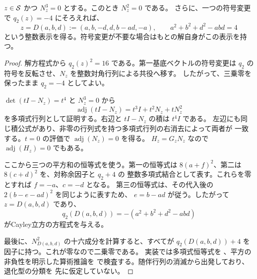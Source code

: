 \begin{proposition}[退化型の整数正規表示]
\label{bp:deg-reduced}
\leanok
\(z\in\mathcal S\) かつ \(N_z^3=0\) とする。このとき \(N_z^2=0\) である。
さらに、一つの符号変更で \(q_2(z)=-4\) にそろえれば、
\[
 z=D(a,b,d):=(a,b,-d,d,b-ad,-a),
 \qquad a^2+b^2+d^2-abd=4
\]
という整数表示を得る。符号変更が不要な場合はもとの解自身がこの表示を持つ。
\end{proposition}
\begin{proof}
\leanok
解方程式から \(q_2(z)^2=16\) である。第一基底ベクトルの符号変更は
\(q_2\) の符号を反転させ、\(N_z\) を整数対角行列による共役へ移す。
したがって、三乗零を保ったまま \(q_2=-4\) としてよい。

\(\det(tI-N_z)=t^4\) と \(N_z^3=0\) から
\[
 \operatorname{adj}(tI-N_z)=t^3I+t^2N_z+tN_z^2
\]
を多項式行列として証明する。右辺と \(tI-N_z\) の積は \(t^4I\) である。
左辺にも同じ積公式があり、非零の行列式を持つ多項式行列の右消去によって両者が
一致する。\(t=0\) の評価で \(\operatorname{adj}(N_z)=0\) を得る。
\(H_z=G_zN_z\) なので \(\operatorname{adj}(H_z)=0\) でもある。

ここから三つの平方和の恒等式を使う。第一の恒等式は
\(8(a+f)^2\)、第二は \(8(c+d)^2\) を、対称余因子と \(q_2+4\) の
整数多項式結合として表す。これらを零とすれば \(f=-a\)、\(c=-d\) となる。
第三の恒等式は、その代入後の \(2(b-e-ad)^2\) を同じように表すため、
\(e=b-ad\) が従う。したがって \(z=D(a,b,d)\) であり、
\[
 q_2(D(a,b,d))=-(a^2+b^2+d^2-abd)
\]
がCayley立方の方程式を与える。

最後に、\(N_{D(a,b,d)}^2\) の十六成分を計算すると、すべてが
\(q_2(D(a,b,d))+4\) を因子に持つ。これが零なので二乗零である。
実装では多項式恒等式を 、平方の非負性を明示した算術推論を
 で検査する。随伴行列の消滅から出発しており、退化型の分類を
先に仮定していない。
\end{proof}

